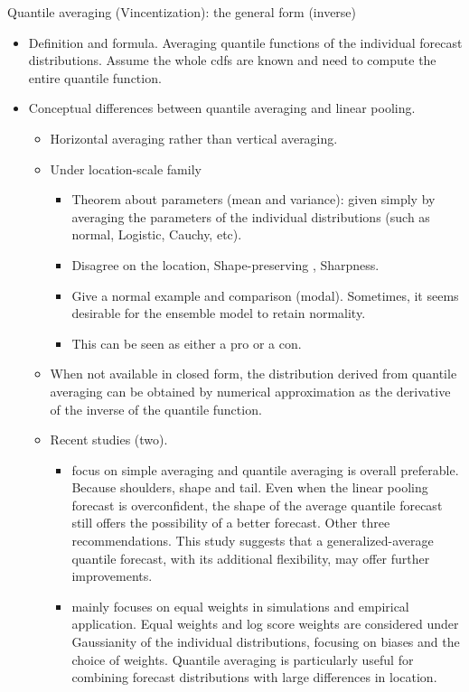 \documentclass[11pt]{article}
\begin{document}
Quantile averaging (Vincentization): the general form (inverse)
\begin{itemize}
  \item Definition and formula. Averaging quantile functions of the individual forecast distributions. Assume the whole cdfs are known and need to compute the entire quantile function.
  \item Conceptual differences between quantile averaging and linear pooling.
  \begin{itemize}
    \item Horizontal averaging rather than vertical averaging.
    \item Under location-scale family \citep[properties,][]{Ratcliff1979-cb,Thomas1980-lp}
    \begin{itemize}
      \item Theorem about parameters (mean and variance): given simply by averaging the parameters of the individual distributions (such as normal, Logistic, Cauchy, etc).
      \item Disagree on the location, Shape-preserving \citep[only family,][]{Kim2021-wa}, Sharpness.
      \item Give a normal example and comparison (modal). Sometimes, it seems desirable for the ensemble model to retain normality.
      \item This can be seen as either a pro or a con.
    \end{itemize}
    \item When not available in closed form, the distribution derived from quantile averaging can be obtained by numerical approximation as the derivative of the inverse of the quantile function.
    \item Recent studies (two).
    \begin{itemize}
      \item \cite{Lichtendahl2013-rt} focus on simple averaging and quantile averaging is overall preferable. Because shoulders, shape and tail. Even when the linear pooling forecast is overconfident, the shape of the average quantile forecast still offers the possibility of a better forecast. Other three recommendations. This study suggests that a generalized-average
      quantile forecast, with its additional flexibility, may offer further improvements.
      \item \cite{Busetti2017-ox} mainly focuses on equal weights in simulations and empirical application. Equal weights and log score weights are considered under Gaussianity of the individual distributions, focusing on biases and the choice of weights. Quantile averaging is particularly useful for combining forecast distributions with large differences in location.

\end{itemize}
\end{itemize}
\end{itemize}
\end{document}
